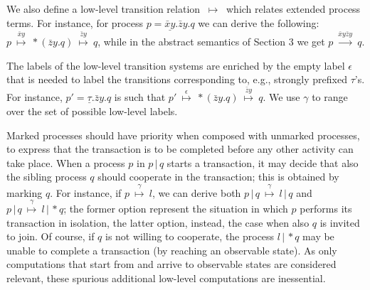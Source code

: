\documentclass[submission,copyright,creativecommons]{eptcs}
\newcommand{\deriv}[1]{{\mbox{${\:\stackrel{#1}{\longrightarrow}\:}$}}}
\newcommand{\para}{\mbox{$\,|\,$}}
\newcommand{\tderiv}[1]{{\mbox{${\:\stackrel{#1}{\longmapsto}\:}$}}}
\begin{document}
We also define  a low-level transition relation $\tderiv{}$ which 
relates extended process terms. For instance, for process $p = \underline{\bar xy}.\bar zy.q$ we can derive the following:
$p \tderiv{\bar xy} *(\bar zy.q) \tderiv{\bar zy} q$, while in the abstract semantics of Section 3 we get $p \deriv{\bar xy \bar zy}  q$.

The labels of the low-level transition systems are enriched by the empty label $\epsilon$ that is needed to label
the transitions corresponding to, e.g., strongly prefixed $\tau$'s. For instance, $p'= \underline\tau.\bar zy.q$ is such that
$p' \tderiv{\epsilon} *(\bar zy.q) \tderiv{\bar zy} q$. We use $\gamma$ to range over the set of possible low-level labels.

Marked processes should have priority when composed with unmarked processes, to express that the transaction
is to be completed before any other activity can take place. When a process $p$ in $p \para q$ starts a transaction,
it may decide that also the sibling process $q$ should cooperate in the transaction; this is obtained by marking $q$.
For instance, if $p \tderiv{\gamma} l$, we can derive both $p \para q \tderiv{\gamma} l \para q$ and $p \para q \tderiv{\gamma} l \para *q$;
the former option represent the situation in which $p$ performs its transaction in isolation, the latter option, instead,
the case when also $q$ is invited to join. Of course, if $q$ is not willing to cooperate, the process $ l \para *q$ may be unable to
complete a transaction (by reaching an observable state). As only computations that start from and arrive to observable states
are considered relevant, these spurious additional low-level computations are inessential.
\end{document}

